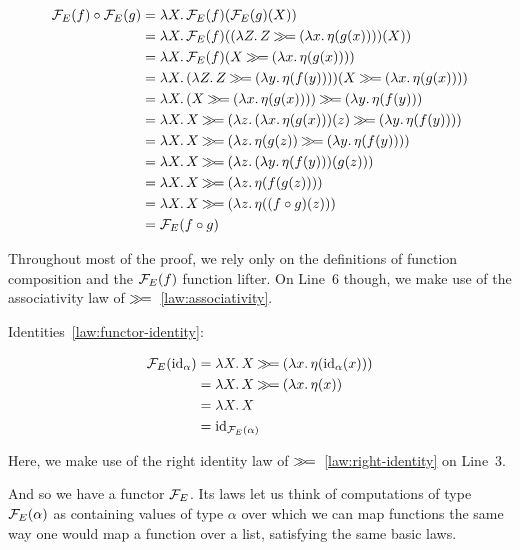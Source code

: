 \setcounter{TemporaryCounter}{\value{equation}}
\setcounter{equation}{0}
\NoChapterPrefix
\begin{align}
  \FF_E(f) \circ \FF_E(g)
  &= \lam{X}{\FF_E(f)(\FF_E(g)(X))} \\
  &= \lam{X}{\FF_E(f)((\lam{Z}{Z \hsbind (\lam{x}{\eta(g(x))})})(X))} \\
  &= \lam{X}{\FF_E(f)(X \hsbind (\lam{x}{\eta(g(x))}))} \\
  &= \lam{X}{(\lam{Z}{Z \hsbind (\lam{y}{\eta(f(y))})})(X \hsbind (\lam{x}{\eta(g(x))}))} \\
  &= \lam{X}{(X \hsbind (\lam{x}{\eta(g(x))})) \hsbind (\lam{y}{\eta(f(y))})} \\
  &= \lam{X}{X \hsbind (\lam{z}{(\lam{x}{\eta(g(x))})(z) \hsbind (\lam{y}{\eta(f(y))})})} \\
  &= \lam{X}{X \hsbind (\lam{z}{\eta(g(z)) \hsbind (\lam{y}{\eta(f(y))})})} \\
  &= \lam{X}{X \hsbind (\lam{z}{(\lam{y}{\eta(f(y))})(g(z))})} \\
  &= \lam{X}{X \hsbind (\lam{z}{\eta(f(g(z)))})} \\
  &= \lam{X}{X \hsbind (\lam{z}{\eta((f \circ g)(z))})} \\
  &= \FF_E(f \circ g)
\end{align}
\setcounter{equation}{\value{TemporaryCounter}}
\ChapterPrefix

Throughout most of the proof, we rely only on the definitions of function
composition and the $\mathcal{F}_E(f)$ function lifter. On Line~6 though, we make
use of the associativity law of $\mathbin{\gg\!=}$~\eqref{law:associativity}.

Identities~\eqref{law:functor-identity}:

\setcounter{TemporaryCounter}{\value{equation}}
\setcounter{equation}{0}
\NoChapterPrefix
\begin{align}
  \mathcal{F}_E(\mathrm{id}_\alpha)
  &= \lambda X.\, X \mathbin{\gg\!=} (\lambda x.\, \eta(\mathrm{id}_\alpha(x))) \\
  &= \lambda X.\, X \mathbin{\gg\!=} (\lambda x.\, \eta(x)) \\
  &= \lambda X.\, X \\
  &= \mathrm{id}_{\mathcal{F}_E(\alpha)}
\end{align}
\setcounter{equation}{\value{TemporaryCounter}}
\ChapterPrefix

Here, we make use of the right identity law of
$\mathbin{\gg\!=}$~\eqref{law:right-identity} on Line~3.

And so we have a functor $\mathcal{F}_E$. Its laws let us think of computations of
type $\mathcal{F}_E(\alpha)$ as containing values of type $\alpha$ over which we
can map functions the same way one would map a function over a list,
satisfying the same basic laws.

